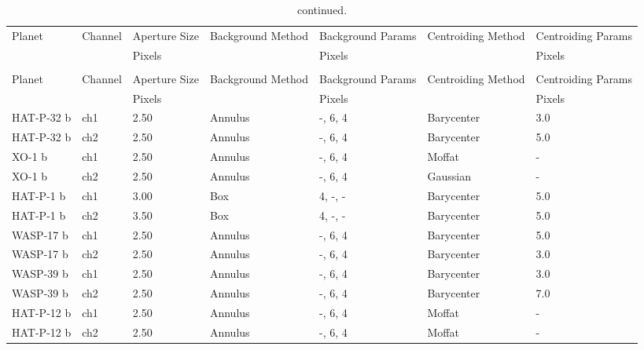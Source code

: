 \begin{subappendices}
{\begin{landscape}
\begin{longtable}{lllllll}
  \hline\hline
  Planet & Channel &  Aperture Size & Background Method &   Background Params & Centroiding Method &  Centroiding Params \\
  & & Pixels & & Pixels & & Pixels \\
  \hline
  \endfirsthead
  \caption{continued.} \\
  \hline\hline
  Planet & Channel &  Aperture Size & Background Method &   Background Params & Centroiding Method &  Centroiding Params \\
  & & Pixels & & Pixels & & Pixels \\
  \hline
  \endhead
  \hline
  \endfoot
  HAT-P-32 b  &     ch1 &           2.50 &           Annulus &         -, 6, 4  &         Barycenter &                 3.0 \\
  HAT-P-32 b  &     ch2 &           2.50 &           Annulus &         -, 6, 4  &         Barycenter &                 5.0 \\
  XO-1 b     &     ch1 &           2.50 &           Annulus &         -, 6, 4  &             Moffat &                 - \\
  XO-1 b     &     ch2 &           2.50 &           Annulus &         -, 6, 4  &           Gaussian &                 - \\
  HAT-P-1 b   &     ch1 &           3.00 &               Box &      4, -, -  &         Barycenter &                 5.0 \\
  HAT-P-1 b   &     ch2 &           3.50 &               Box &      4, -, -  &         Barycenter &                 5.0 \\
  WASP-17 b  &     ch1 &           2.50 &           Annulus &         -, 6, 4  &         Barycenter &                 5.0 \\
  WASP-17 b  &     ch2 &           2.50 &           Annulus &         -, 6, 4  &         Barycenter &                 3.0 \\
  WASP-39 b  &     ch1 &           2.50 &           Annulus &         -, 6, 4  &         Barycenter &                 3.0 \\
  WASP-39 b  &     ch2 &           2.50 &           Annulus &         -, 6, 4  &         Barycenter &                 7.0 \\
  HAT-P-12 b  &     ch1 &           2.50 &           Annulus &         -, 6, 4  &             Moffat &                 - \\
  HAT-P-12 b  &     ch2 &           2.50 &           Annulus &         -, 6, 4  &             Moffat &                 - \\

\end{longtable}
\end{landscape}}
\end{subappendices}
